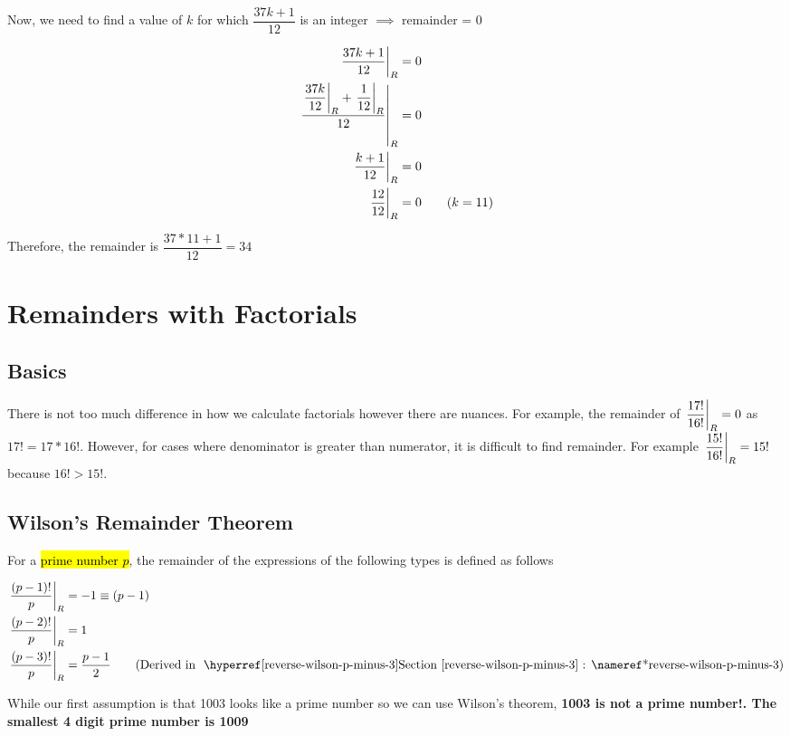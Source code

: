 Now, we need to find a value of $k$ for which $\dfrac{37k + 1}{12}$ is an integer $\implies$ remainder = 0

\begin{align*}
    \displaystyle{ \left. \frac{37k + 1}{12} \right |_{R} } &= 0 \\
    \displaystyle{ \left. \frac{ \displaystyle{ \left. \frac{37k}{12} \right |_{R} } + \displaystyle{ \left. \frac{1}{12} \right |_{R} } }{12} \right |_{R} } &= 0 \\
    \displaystyle{ \left. \frac{ k + 1 }{12} \right |_{R} } &= 0 \\
    \displaystyle{ \left. \frac{ 12 }{12} \right |_{R} } &= 0 \tag{$k=11$}
\end{align*}

Therefore, the remainder is $\dfrac{37 * 11 + 1}{12} = 34$

\section{Remainders with Factorials}

\subsection{Basics}

There is not too much difference in how we calculate factorials however there are nuances. For example, the remainder of $\displaystyle{ \left. \frac{17!}{16!} \right |_{R} } = 0$ as $17! = 17 * 16!$. However, for cases where denominator is greater than numerator, it is difficult to find remainder. For example $\displaystyle{ \left. \frac{15!}{16!} \right |_{R} } = 15!$ because $16! > 15!$. \\

\subsection{Wilson's Remainder Theorem}

For a \hl{prime number $p$}, the remainder of the expressions of the following types is defined as follows

\begin{align*}
    \remFrac{(p-1)!}{p} &= -1 \equiv (p-1) \\
    \remFrac{(p-2)!}{p} &= 1 \\
    \remFrac{(p-3)!}{p} &= \dfrac{p-1}{2} \tag{Derived in \fullref{reverse-wilson-p-minus-3}}
\end{align*}


\begin{WARNING}
    While our first assumption is that 1003 looks like a prime number so we can use Wilson's theorem, \textbf{1003 is not a prime number!. The smallest 4 digit prime number is 1009}
\end{WARNING}

